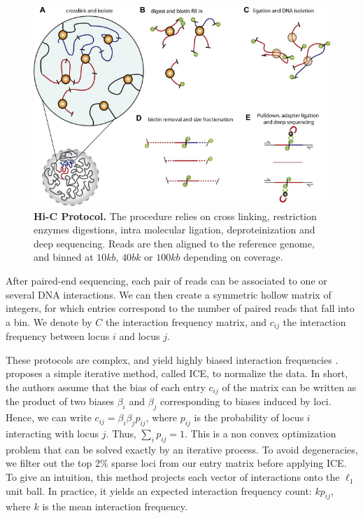 \begin{figure}
\begin{center}
\includegraphics[width=0.8\linewidth]{figures/hic_protocol.png}
\end{center}
\caption{\textbf{Hi-C Protocol.} The procedure relies on cross linking,
restriction enzymes digestions, intra molecular ligation, deproteinization and
deep sequencing. Reads are then aligned to the reference genome, and binned at
$10kb$, $40bk$ or $100kb$ depending on coverage.}
\end{figure}


After paired-end sequencing, each pair of reads can be associated to one
\citep{lieberman-aiden:comprehensive} or several \citep{ay:identifying} DNA
interactions. We can then create a symmetric hollow matrix of integers, for
which entries correspond to the number of paired reads that fall into a bin.
We denote by $C$ the interaction frequency matrix, and $c_{ij}$ the
interaction frequency between locus $i$ and locus $j$.

These protocols are complex, and yield highly biased interaction frequencies
\citep{imakaev:iterative, cournac:normalization, yaffe:probabilistic}.
\citet{imakaev:iterative} proposes a simple iterative method, called ICE, to
normalize the data. In short, the authors assume that the bias of each entry
$c_{ij}$ of the matrix can be written as the product of two biases $\beta_i$
and $\beta_j$ corresponding to biases induced by loci. Hence, we can write
$c_{ij} = \beta_i \beta_j p_{ij}$, where $p_{ij}$ is the probability of locus
$i$ interacting with locus $j$. Thus, $\sum_i p_{ij} = 1$. This is a non convex
optimization problem that can be solved exactly by an iterative process. To
avoid degeneracies, we filter out the top 2\% sparse loci from our entry
matrix before applying ICE. To give an intuition, this method projects each
vector of interactions onto the $\ell_1$ unit ball. In practice, it yields an
expected interaction frequency count: $k p_{ij}$, where $k$ is the mean
interaction frequency.

